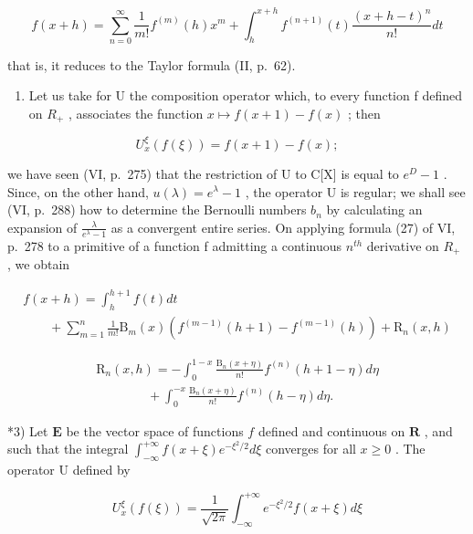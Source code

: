 \[
f (x + h) = \sum_ {n = 0} ^ {\infty} \frac {1}{m !} f ^ {(m)} (h) x ^ {m} + \int_ {h} ^ {x + h} f ^ {(n + 1)} (t) \frac {(x + h - t) ^ {n}}{n !} d t
\]

that is, it reduces to the Taylor formula (II, p.~62).

\begin{enumerate}
\def\labelenumi{\arabic{enumi})}
\setcounter{enumi}{1}
\tightlist
\item
  Let us take for U the composition operator which, to every function f defined on \(R_{+}\) , associates the function \(x \mapsto f(x + 1) - f(x)\) ; then
\end{enumerate}

\[
U _ {x} ^ {\xi} (f (\xi)) = f (x + 1) - f (x);
\]

we have seen (VI, p.~275) that the restriction of U to C{[}X{]} is equal to \(e^{D}-1\) . Since, on the other hand, \(u(\lambda)=e^{\lambda}-1\) , the operator U is regular; we shall see (VI, p.~288) how to determine the Bernoulli numbers \(b_{n}\) by calculating an expansion of \(\frac{\lambda}{e^{\lambda}-1}\) as a convergent entire series. On applying formula (27) of VI, p.~278 to a primitive of a function f admitting a continuous \(n^{th}\) derivative on \(R_{+}\) , we obtain

\[
\begin{array}{l} f (x + h) = \int_ {h} ^ {h + 1} f (t) d t \\ \qquad + \sum_ {m = 1} ^ {n} \frac {1}{m !} \mathrm{B} _ {m} (x) \left(f ^ {(m - 1)} (h + 1) - f ^ {(m - 1)} (h)\right) + \mathrm{R} _ {n} (x, h) \end{array}\tag{35}
\]

\[
\begin{array}{l} \mathrm{R} _ {n} (x, h) = - \int_ {0} ^ {1 - x} \frac {\mathrm{B} _ {n} (x + \eta)}{n !} f ^ {(n)} (h + 1 - \eta) d \eta \\ \qquad \qquad + \int_ {0} ^ {- x} \frac {\mathrm{B} _ {n} (x + \eta)}{n !} f ^ {(n)} (h - \eta) d \eta . \end{array}\tag{36}
\]

*3) Let \(\mathbf{E}\) be the vector space of functions \(f\) defined and continuous on \(\mathbf{R}\) , and such that the integral \(\int_{-\infty}^{+\infty} f(x + \xi)e^{-\xi^2 / 2}d\xi\) converges for all \(x \geqslant 0\) . The operator \(\mathrm{U}\) defined by

\[
U _ {x} ^ {\xi} (f (\xi)) = \frac {1}{\sqrt {2 \pi}} \int_ {- \infty} ^ {+ \infty} e ^ {- \xi^ {2} / 2} f (x + \xi) d \xi
\]

